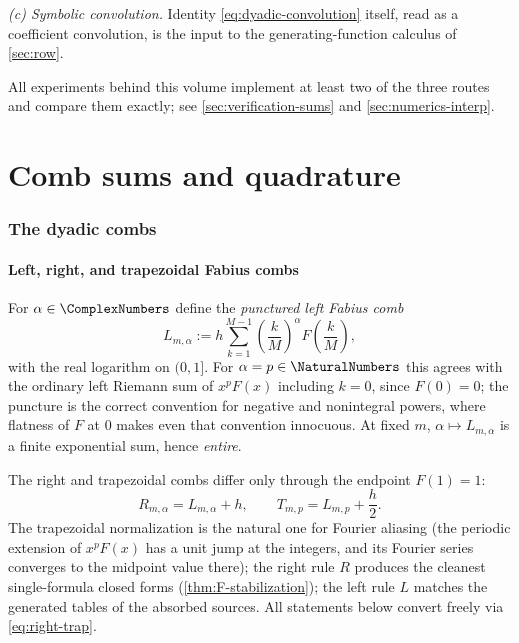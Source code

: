 \documentclass[11pt,oneside]{article}
\numberwithin{equation}{section}
\theoremstyle{definition}
\theoremstyle{remark}
\begin{document}
\emph{(c) Symbolic convolution.}  Identity
\eqref{eq:dyadic-convolution} itself, read as a coefficient convolution,
is the input to the generating-function calculus of
\cref{sec:row}.

All experiments behind this volume implement at least two of the three
routes and compare them exactly; see \cref{sec:verification-sums} and
\cref{sec:numerics-interp}.

\part{Comb sums and quadrature}
\label{part:sums}

\section{The dyadic combs}
\label{sec:combs}

\subsection{Left, right, and trapezoidal Fabius combs}

For $\alpha\in\ComplexNumbers$ define the \emph{punctured left Fabius comb}
\begin{equation}
 L_{m,\alpha}
 :=h\sum_{k=1}^{M-1}
 \left(\frac{k}{M}\right)^{\alpha}F\!\left(\frac{k}{M}\right),
 \label{eq:L-def}
\end{equation}
with the real logarithm on $(0,1]$.  For $\alpha=p\in\NaturalNumbers$ this agrees
with the ordinary left Riemann sum of $x^pF(x)$ including $k=0$, since
$F(0)=0$; the puncture is the correct convention for negative and
nonintegral powers, where flatness of $F$ at $0$ makes even that
convention innocuous.  At fixed $m$, $\alpha\mapsto L_{m,\alpha}$ is a
finite exponential sum, hence \emph{entire}.

The right and trapezoidal combs differ only through the endpoint
$F(1)=1$:
\begin{equation}
 R_{m,\alpha}=L_{m,\alpha}+h,
 \qquad
 T_{m,p}=L_{m,p}+\frac h2.
 \label{eq:right-trap}
\end{equation}
The trapezoidal normalization is the natural one for Fourier aliasing
(the periodic extension of $x^pF(x)$ has a unit jump at the integers,
and its Fourier series converges to the midpoint value there); the
right rule $R$ produces the cleanest single-formula closed forms
(\cref{thm:F-stabilization}); the left rule $L$ matches the generated
tables of the absorbed sources.  All statements below convert freely
via \eqref{eq:right-trap}.
\end{document}
